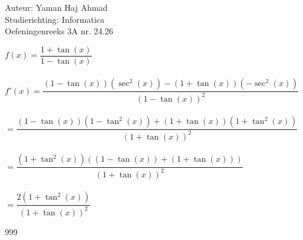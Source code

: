 \documentclass[a4paper]{article}
\begin{document}
\noindent \large Auteur: Yaman Haj Ahmad \\
\noindent \large Studierichting: Informatica\\
\noindent \large Oefeningenreeks 3A nr. 24.26\\

\medskip

\normalsize

$f(x) = \dfrac{1+\tan\left(x\right)}{1-\tan\left(x\right)}$\\\\

$f'(x) = \dfrac{\left(1-\tan\left(x\right)\right)\left(\sec^2\left(x\right)\right)-\left(1 + \tan\left(x\right)\right)\left(-\sec^2\left(x\right)\right)}{\left(1-\tan\left(x\right)\right)^2}$\\\\

$= \dfrac{\left(1-\tan\left(x\right)\right)\left(1-\tan^2\left(x\right)\right)+\left(1+\tan\left(x\right)\right)\left(1+\tan^2\left(x\right)\right)}{\left(1+\tan\left(x\right)\right)^2}$\\\\

$= \dfrac{\left(1+\tan^2\left(x\right)\right)\left(\left(1-\tan\left(x\right)\right)+\left(1+\tan\left(x\right)\right)\right)}{\left(1+\tan\left(x\right)\right)^2}$\\\\

$= \dfrac{2\left(1+\tan^2\left(x\right)\right)}{\left(1+\tan\left(x\right)\right)^2}$

\begin{thebibliography}{999}
\end{thebibliography}
\end{document}
